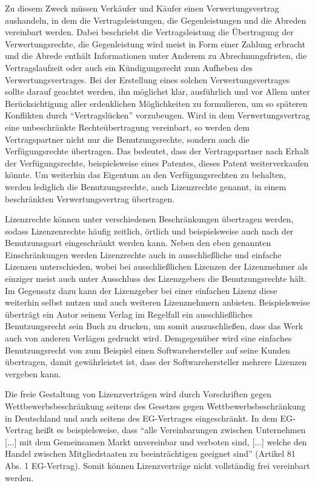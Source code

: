 Zu diesem Zweck müssen Verkäufer und Käufer einen Verwertungsvertrag aushandeln, in dem die Vertragsleistungen, die Gegenleistungen und die Abreden vereinbart werden.
Dabei beschriebt die Vertragsleistung die Übertragung der Verwertungsrechte, die Gegenleistung wird meist in Form einer Zahlung erbracht und die Abrede enthält Informationen unter Anderem
zu Abrechnungsfristen, die Vertragslaufzeit oder auch ein Kündigungsrecht zum Aufheben des Verwertungsvertrages. Bei der Erstellung eines solchen Verwertungsvertrages sollte darauf geachtet werden,
ihn möglichst klar, ausführlich und vor Allem unter Berücksichtigung aller erdenklichen Möglichkeiten zu formulieren, um so späteren Konflikten durch “Vertragslücken” vorzubeugen.
Wird in dem Verwertungsvertrag eine unbeschränkte Rechteübertragung vereinbart, so werden dem Vertragspartner nicht nur die Benutzungsrechte, sondern auch die Verfügungsrechte übertragen.
Das bedeutet, dass der Vertragspartner nach Erhalt der Verfügungsrechte, beispielsweise eines Patentes, dieses Patent weiterverkaufen könnte. Um weiterhin das Eigentum an den Verfügungsrechten
zu behalten, werden lediglich die Benutzungsrechte, auch Lizenzrechte genannt, in einem beschränkten Verwertungsvertrag übertragen. 

Lizenzrechte können unter verschiedenen Beschränkungen übertragen werden, sodass Lizenzenrechte häufig zeitlich, örtlich und beispielsweise auch nach der Benutzunsgsart eingeschränkt werden kann.
Neben den eben genannten Einschränkungen werden Lizenzrechte auch in ausschließliche und einfache Lizenzen unterschieden, wobei bei ausschließlichen Lizenzen der Lizenznehmer als einziger meist
auch unter Ausschluss des Lizenzgebers die Benutzungsrechte hält. Im Gegensatz dazu kann der Lizenzgeber bei einer einfachen Lizenz diese weiterhin selbst nutzen und auch weiteren Lizenznehmern
anbieten. Beispielsweise überträgt ein Autor seinem Verlag im Regelfall ein ausschließliches Benutzungsrecht sein Buch zu drucken, um somit auszuschließen, dass das Werk auch von anderen Verlägen
gedruckt wird. Demgegenüber wird eine einfaches Benutzungsrecht von zum Beispiel einen Softwarehersteller auf seine Kunden übertragen, damit gewährleistet ist, dass der Softwarehersteller mehrere
Lizenzen vergeben kann. 

Die freie Gestaltung von Lizenzverträgen wird durch Vorschriften gegen Wettbewerbsbeschränkung seitens des Gesetzes gegen Wettbewerbsbeschränkung in Deutschland und auch seitens des EG-Vertrages
eingeschränkt. In dem EG-Vertrag heißt es beispielsweise, dass “alle Vereinbarungen zwischen Unternehmen [...] mit dem Gemeinsamen Markt unvereinbar und verboten sind, [...] welche den Handel
zwischen Mitgliedstaaten zu beeinträchtigen geeignet sind” (Artikel 81 Abs. 1 EG-Vertrag). Somit können Lizenzverträge nicht vollständig frei vereinbart werden. 
